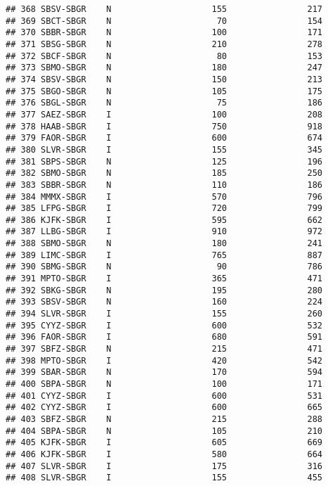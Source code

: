 \documentclass[
]{article}
\begin{document}
\begin{verbatim}
## 368 SBSV-SBGR    N                    155                217
## 369 SBCT-SBGR    N                     70                154
## 370 SBBR-SBGR    N                    100                171
## 371 SBSG-SBGR    N                    210                278
## 372 SBCF-SBGR    N                     80                153
## 373 SBMO-SBGR    N                    180                247
## 374 SBSV-SBGR    N                    150                213
## 375 SBGO-SBGR    N                    105                175
## 376 SBGL-SBGR    N                     75                186
## 377 SAEZ-SBGR    I                    100                208
## 378 HAAB-SBGR    I                    750                918
## 379 FAOR-SBGR    I                    600                674
## 380 SLVR-SBGR    I                    155                345
## 381 SBPS-SBGR    N                    125                196
## 382 SBMO-SBGR    N                    185                250
## 383 SBBR-SBGR    N                    110                186
## 384 MMMX-SBGR    I                    570                796
## 385 LFPG-SBGR    I                    720                799
## 386 KJFK-SBGR    I                    595                662
## 387 LLBG-SBGR    I                    910                972
## 388 SBMO-SBGR    N                    180                241
## 389 LIMC-SBGR    I                    765                887
## 390 SBMG-SBGR    N                     90                786
## 391 MPTO-SBGR    I                    365                471
## 392 SBKG-SBGR    N                    195                280
## 393 SBSV-SBGR    N                    160                224
## 394 SLVR-SBGR    I                    155                260
## 395 CYYZ-SBGR    I                    600                532
## 396 FAOR-SBGR    I                    680                591
## 397 SBFZ-SBGR    N                    215                471
## 398 MPTO-SBGR    I                    420                542
## 399 SBAR-SBGR    N                    170                594
## 400 SBPA-SBGR    N                    100                171
## 401 CYYZ-SBGR    I                    600                531
## 402 CYYZ-SBGR    I                    600                665
## 403 SBFZ-SBGR    N                    215                288
## 404 SBPA-SBGR    N                    105                210
## 405 KJFK-SBGR    I                    605                669
## 406 KJFK-SBGR    I                    580                664
## 407 SLVR-SBGR    I                    175                316
## 408 SLVR-SBGR    I                    155                455

\end{verbatim}
\end{document}
